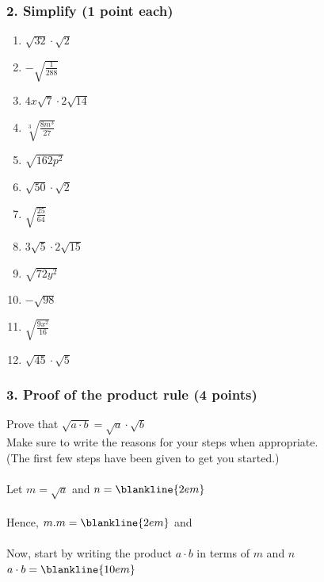 \documentclass{hw}
\begin{document}
\subsubsection*{2. Simplify (1 point each)}
\begin{enumerate}[label=\alph*.]
    \item $\sqrt{32} \cdot \sqrt{2}$
    \studentxlargeworkspace
    \item $-\sqrt{\frac{1}{288}}$
    \studentxlargeworkspace
    \item $4x\sqrt{7} \cdot 2\sqrt{14}$
    \studentxlargeworkspace
    \item $\sqrt[3]{\frac{8m^3}{27}}$
    \studentxlargeworkspace
    \item $\sqrt{162p^2}$
    \studentxlargeworkspace
    \item $\sqrt{50} \cdot \sqrt{2}$
    \studentxlargeworkspace
    \item $\sqrt{\frac{25}{64}}$
    \studentxlargeworkspace
    \item $3\sqrt{5} \cdot 2\sqrt{15}$
    \studentxlargeworkspace
    \item $\sqrt{72y^2}$
    \studentxlargeworkspace
    \item $-\sqrt{98}$
    \studentxlargeworkspace
    \item $\sqrt{\frac{9x^2}{16}}$
    \studentxlargeworkspace
    \item $\sqrt{45} \cdot \sqrt{5}$
    \studentxlargeworkspace
\end{enumerate}

\newpage
\subsubsection*{3. Proof of the product rule (4 points)}
Prove that $\sqrt{a \cdot b} = \sqrt{a} \cdot \sqrt{b}$ \\
Make sure to write the reasons for your steps when appropriate.
\\ \bigskip
(The first few steps have been given to get you started.) \\
\\ \bigskip
Let $m = \sqrt{a}$ and $n = \blankline{2em}$ \\
\\ \bigskip
Hence, $m.m = \blankline{2em}$ and \blankline{10em} \\
 \\ \bigskip \bigskip
Now, start by writing the product $a \cdot b$ in terms of $m$ and $n$ \\
$a \cdot b = \blankline{10em}$ \\
\end{document}
